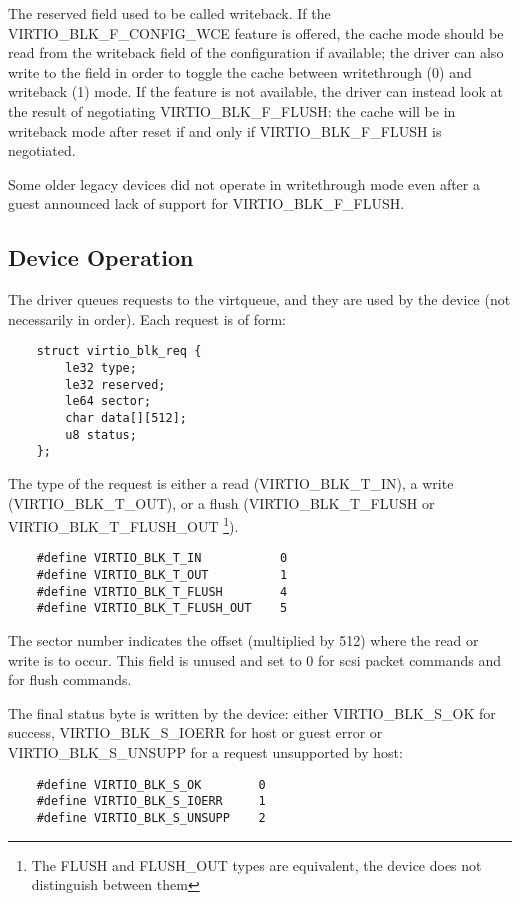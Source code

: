 The reserved field used to be called writeback.  If the
VIRTIO_BLK_F_CONFIG_WCE feature is offered, the cache mode should be
read from the writeback field of the configuration if available; the
driver can also write to the field in order to toggle the cache
between writethrough (0) and writeback (1) mode.  If the feature is
not available, the driver can instead look at the result of
negotiating VIRTIO_BLK_F_FLUSH: the cache will be in writeback mode
after reset if and only if VIRTIO_BLK_F_FLUSH is negotiated.

Some older legacy devices did not operate in writethrough mode even
after a guest announced lack of support for VIRTIO_BLK_F_FLUSH.

\subsection{Device Operation}\label{sec:Device Types / Block Device / Device Operation}

The driver queues requests to the virtqueue, and they are used by
the device (not necessarily in order). Each request is of form:

\begin{lstlisting}
	struct virtio_blk_req {
		le32 type;
		le32 reserved;
		le64 sector;
		char data[][512];
		u8 status;
	};
\end{lstlisting}

The type of the request is either a read (VIRTIO_BLK_T_IN), a write
(VIRTIO_BLK_T_OUT), or a flush (VIRTIO_BLK_T_FLUSH or
VIRTIO_BLK_T_FLUSH_OUT
\footnote{The FLUSH and FLUSH_OUT types are equivalent, the device does not
distinguish between them
}).

\begin{lstlisting}
	#define VIRTIO_BLK_T_IN           0
	#define VIRTIO_BLK_T_OUT          1
	#define VIRTIO_BLK_T_FLUSH        4
	#define VIRTIO_BLK_T_FLUSH_OUT    5
\end{lstlisting}

The sector number indicates the offset (multiplied by 512) where
the read or write is to occur. This field is unused and set to 0
for scsi packet commands and for flush commands.

The final status byte is written by the device: either
VIRTIO_BLK_S_OK for success, VIRTIO_BLK_S_IOERR for host or guest
error or VIRTIO_BLK_S_UNSUPP for a request unsupported by host:

\begin{lstlisting}
	#define VIRTIO_BLK_S_OK        0
	#define VIRTIO_BLK_S_IOERR     1
	#define VIRTIO_BLK_S_UNSUPP    2
\end{lstlisting}

